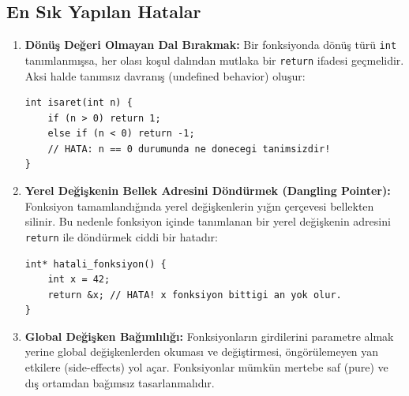 \subsection{En Sık Yapılan Hatalar}

\begin{enumerate}
    \item \textbf{Dönüş Değeri Olmayan Dal Bırakmak:} Bir fonksiyonda dönüş türü \texttt{int} tanımlanmışsa, her olası koşul dalından mutlaka bir \texttt{return} ifadesi geçmelidir. Aksi halde tanımsız davranış (undefined behavior) oluşur:
\begin{lstlisting}[language=CTemel]
int isaret(int n) {
    if (n > 0) return 1;
    else if (n < 0) return -1;
    // HATA: n == 0 durumunda ne donecegi tanimsizdir!
}
\end{lstlisting}
    \item \textbf{Yerel Değişkenin Bellek Adresini Döndürmek (Dangling Pointer):} Fonksiyon tamamlandığında yerel değişkenlerin yığın çerçevesi bellekten silinir. Bu nedenle fonksiyon içinde tanımlanan bir yerel değişkenin adresini \texttt{return} ile döndürmek ciddi bir hatadır:
\begin{lstlisting}[language=CTemel]
int* hatali_fonksiyon() {
    int x = 42;
    return &x; // HATA! x fonksiyon bittigi an yok olur.
}
\end{lstlisting}
    \item \textbf{Global Değişken Bağımlılığı:} Fonksiyonların girdilerini parametre almak yerine global değişkenlerden okuması ve değiştirmesi, öngörülemeyen yan etkilere (side-effects) yol açar. Fonksiyonlar mümkün mertebe saf (pure) ve dış ortamdan bağımsız tasarlanmalıdır.
\end{enumerate}
